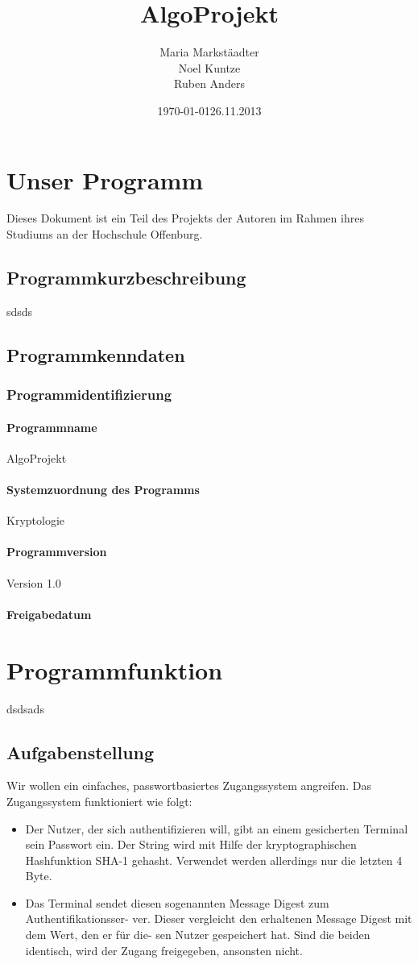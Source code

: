 \documentclass[11pt]{article}
\title{\textbf{AlgoProjekt}}
\author{Maria Markstäadter\\
                Noel Kuntze\\
                Ruben Anders\\}
\date{\today}
\begin{document}
\maketitle

\newpage

\tableofcontents

\newpage

  \section{Unser Programm}
Dieses Dokument ist ein Teil des Projekts der Autoren im Rahmen ihres Studiums an der Hochschule Offenburg.
  \subsection{Programmkurzbeschreibung}
  sdsds
  \subsection{Programmkenndaten}
  \subsubsection{Programmidentifizierung}
  \paragraph{Programmname}
  AlgoProjekt
  \paragraph{Systemzuordnung des Programms}
  Kryptologie
  \paragraph{Programmversion}
  Version 1.0
  \paragraph{Freigabedatum}
  \date{26.11.2013}
  \section{Programmfunktion}
  dsdsads
  \subsection{Aufgabenstellung}
  Wir wollen ein einfaches, passwortbasiertes Zugangssystem angreifen. Das Zugangssystem
funktioniert wie folgt:
\begin{itemize} 
\item Der Nutzer, der sich authentifizieren will, gibt an einem gesicherten Terminal sein
Passwort ein. Der String wird mit Hilfe der kryptographischen Hashfunktion SHA-1
gehasht. Verwendet werden allerdings nur die letzten 4 Byte.
\item Das Terminal sendet diesen sogenannten Message Digest zum Authentifikationsser-
ver. Dieser vergleicht den erhaltenen Message Digest mit dem Wert, den er für die-
sen Nutzer gespeichert hat. Sind die beiden identisch, wird der Zugang freigegeben,
ansonsten nicht.
\end{itemize}
\end{document}

